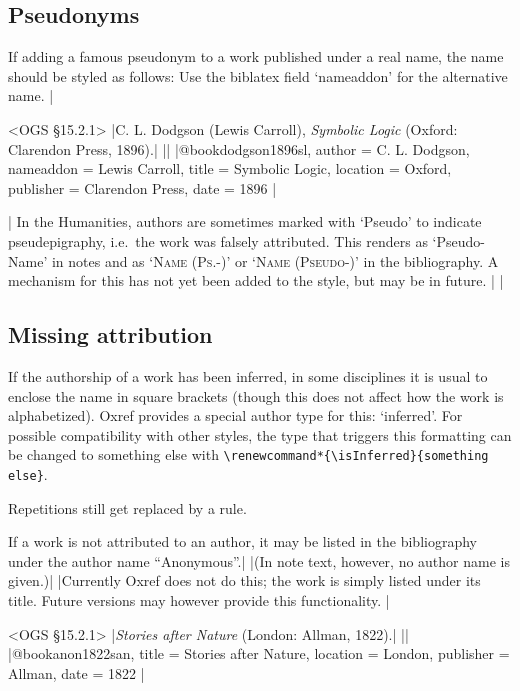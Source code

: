 \documentclass[extrafontsizes,11pt,a4paper,oneside]{memoir}
\newcommand*{\code}[1]{`\textsf{#1}'}
\def\isInferred{inferred}
\begin{document}
\subsection{Pseudonyms}

If adding a famous pseudonym to a work published under a real name,
the name should be styled as follows:
Use the \textsf{biblatex} field \code{nameaddon} for the alternative name.
|

\bibexample<OGS \S15.2.1>
|C. L. Dodgson (Lewis Carroll), \emph{Symbolic Logic} (Oxford: Clarendon Press, 1896).|%
||%
|@book{dodgson1896sl,
  author = {C. L. Dodgson},
  nameaddon = {Lewis Carroll},
  title = {Symbolic Logic},
  location = {Oxford},
  publisher = {Clarendon Press},
  date = {1896}
}|

\todoc[oxnotes]|
In the Humanities, authors are sometimes marked with ‘Pseudo’ to indicate
pseudepigraphy, i.e.\ the work was falsely attributed. This renders as
‘Pseudo-Name’ in notes and as ‘\textsc{Name (Ps.-)}’ or ‘\textsc{Name (Pseudo-)}’
in the bibliography. A mechanism for this has not yet been added to the style,
but may be in future.
|
\todoc|
\subsection{Missing attribution}

If the authorship of a work has been inferred, in some disciplines it is usual
to enclose the name in square brackets (though this does not affect how the work
is alphabetized). Oxref provides a special author type for this: \code{inferred}.
For possible compatibility with other styles, the type that triggers this formatting
can be changed to something else with \lstinline!\renewcommand*{\isInferred}{something else}!.

Repetitions still get replaced by a rule.\\

If a work is not attributed to an author, it may be listed in the bibliography
under the author name \enquote{Anonymous}.|
\todoc[oxnotes]|(In note text, however, no author name is given.)|
\todoc|Currently Oxref does not do this; the work is simply listed under its title.
Future versions may however provide this functionality.
|

\bibexample<OGS \S15.2.1>
|\emph{Stories after Nature} (London: Allman, 1822).|%
||%
|@book{anon1822san,
  title = {Stories after Nature},
  location = {London},
  publisher = {Allman},
  date = {1822}
}|
\end{document}
